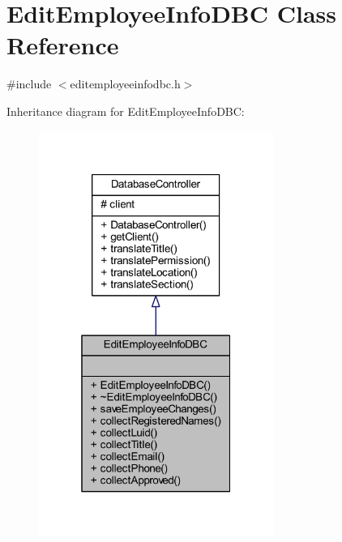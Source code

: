 \hypertarget{class_edit_employee_info_d_b_c}{}\section{Edit\+Employee\+Info\+D\+B\+C Class Reference}
\label{class_edit_employee_info_d_b_c}


{\ttfamily \#include $<$editemployeeinfodbc.\+h$>$}



Inheritance diagram for Edit\+Employee\+Info\+D\+B\+C\+:
\nopagebreak
\begin{figure}[H]
\begin{center}
\leavevmode
\includegraphics[width=217pt]{class_edit_employee_info_d_b_c__inherit__graph}
\end{center}
\end{figure}


